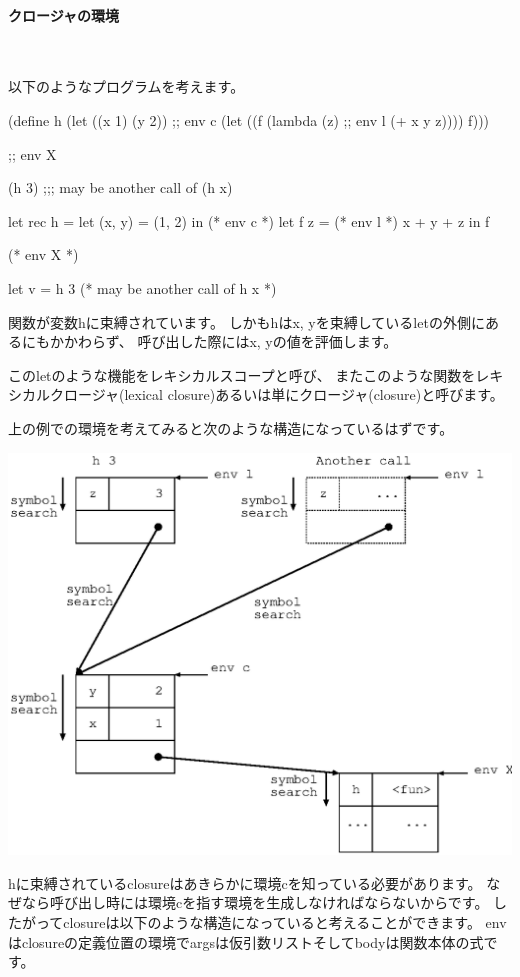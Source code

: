 \documentclass[mingoth,a4paper]{jsarticle}
\begin{document}
\paragraph{クロージャの環境} \ 

以下のようなプログラムを考えます。

\begin{commandline}
(define h
  (let ((x 1) (y 2))
    ;; env c
    (let ((f (lambda (z)
               ;; env l
	       (+ x y z))))
      f)))

;; env X

(h 3)
;;; may be another call of (h x)
\end{commandline}

\begin{commandline}
let rec h =
  let (x, y) = (1, 2) in
  (* env c *)
  let f z =
    (* env l *)
    x + y + z
  in f

(* env X *)

let v = h 3
(* may be another call of h x *)
\end{commandline}

関数が変数hに束縛されています。
しかもhはx, yを束縛しているletの外側にあるにもかかわらず、
呼び出した際にはx, yの値を評価します。

このletのような機能をレキシカルスコープと呼び、
またこのような関数をレキシカルクロージャ(lexical closure)あるいは単にクロージャ(closure)と呼びます。

上の例での環境を考えてみると次のような構造になっているはずです。

 \includegraphics[height=0.5\hsize]{image201002/caml-env015.eps}

hに束縛されているclosureはあきらかに環境cを知っている必要があります。
なぜなら呼び出し時には環境cを指す環境を生成しなければならないからです。
したがってclosureは以下のような構造になっていると考えることができます。
envはclosureの定義位置の環境でargsは仮引数リストそしてbodyは関数本体の式です。
\end{document}
